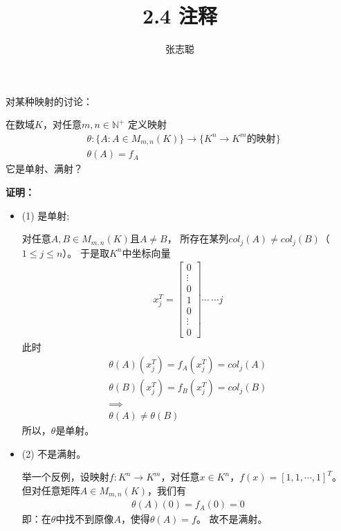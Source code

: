 \documentclass{article}
\begin{document}
\title{2.4 注释}
\author{张志聪}
\maketitle

\begin{zremark}
  对某种映射的讨论：

  在数域$K$，对任意$m,n \in \mathbb{N}^+$
  定义映射
  \begin{align*}
     & \theta     :  \{A: A \in M_{m,n}(K)\} \to \{K^n \to K^m \text{的映射}\} \\
     & \theta(A)  = f_A
  \end{align*}
  它是单射、满射？
\end{zremark}

\textbf{证明：}

\begin{itemize}
  \item (1) 是单射;

        对任意$A, B \in M_{m,n}(K)$且$A \neq B$，
        所存在某列$col_j(A) \neq col_j(B)$（$1 \leq j \leq n$）。
        于是取$K^n$中坐标向量
        \begin{align*}
          x_j^T = \begin{bmatrix}
                    0      \\
                    \vdots \\
                    0      \\
                    1      \\
                    0      \\
                    \vdots
                    \\ 0
                  \end{bmatrix}
          \cdots \ \cdots j
        \end{align*}
        此时
        \begin{align*}
          \theta(A)(x_j^T) = f_A(x_j^T) = col_j(A) \\
          \theta(B)(x_j^T) = f_B(x_j^T) = col_j(B) \\
          \implies                                 \\
          \theta(A) \neq \theta(B)
        \end{align*}
        所以，$\theta$是单射。
  \item (2) 不是满射。

        举一个反例，设映射$f: K^n \to K^m $，对任意$x \in K^n$，$f(x) = [1, 1, \cdots, 1]^T$。
        但对任意矩阵$A \in M_{m,n}(K)$，我们有
        \begin{align*}
          \theta(A)(0) = f_A(0) = 0
        \end{align*}
        即：在$\theta$中找不到原像$A$，使得$\theta(A) = f$。
        故不是满射。
\end{itemize}
\end{document}
